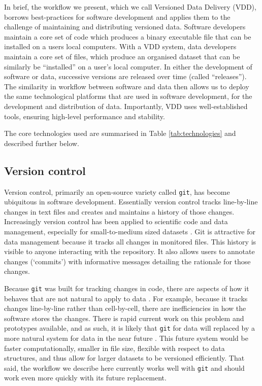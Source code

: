 \documentclass[a4paper,11pt]{article}
\begin{document}

In brief, the workflow we present, which we call Versioned Data Delivery (VDD), borrows best-practices for software development \cite{Perez-Riverol-2016} and applies them to the challenge of maintaining and distributing versioned data. Software developers maintain a core set of code which produces a binary executable file that can be installed on a users local  computers. With a VDD system, data developers maintain a core set of files, which produce an organised dataset that can be similarly be ``installed'' on a user's local computer. In either the development of software or data, successive versions are released over time (called ``releases''). The similarity in workflow between software and data then allows us to deploy the same technological platforms that are used in software development, for the development and distribution of data. Importantly, VDD uses well-established tools, ensuring high-level performance and stability.

The core technologies used are summarised in Table \ref{tab:technologies} and described further below.

\subsection{Version control}

Version control, primarily an open-source variety called \texttt{git}, has become ubiquitous in software development.  Essentially version control tracks line-by-line changes in text files and creates and maintains a history of those changes. Increasingly version control has been applied to scientific code and data management, especially for small-to-medium sized datasets \citep{Ram-2013, Perkel-2016}. Git is attractive for data management because it tracks all changes in monitored files. This history is visible to anyone interacting with the repository. It also allows users to annotate changes (`commits') with informative messages detailing the rationale for those changes.
  
Because \texttt{git} was built for tracking changes in code, there are aspects of how it behaves that are not natural to apply to  data \cite{Perkel-2016}.  For example, because it tracks changes line-by-line rather than cell-by-cell, there are inefficiencies in how the software stores the changes.  There is rapid current work on this problem and prototypes available, and as such, it is likely that \texttt{git} for data will replaced by a more natural system for data in the near future  \citep{Fli, Dat}.  This future system would be faster computationally, smaller in file size, flexible with respect to data structures, and thus allow for larger datasets to be versioned efficiently.  That said, the workflow we describe here currently works well with \texttt{git} and should work even more quickly with its future replacement.
\end{document}

